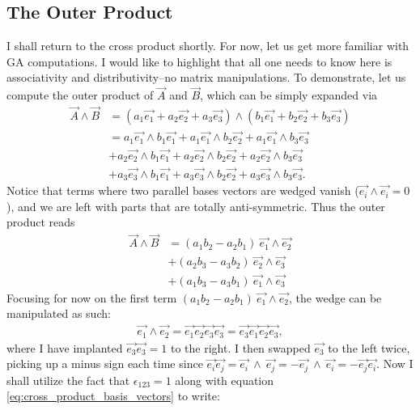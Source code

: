 \subsection{The Outer Product}
I shall return to the cross product shortly. For now, let us get more familiar with GA computations. I would like to highlight that all one needs to know here is associativity and distributivity--no matrix manipulations. To demonstrate, let us compute the outer product of $\vec{A} $ and $\vec{B} $, which can be simply expanded via
\begin{align*}
    \vec{A} \wedge \vec{B}  &= (a_1 \vec{e_1} + a_2 \vec{e_2} + a_3 \vec{e_3}) \wedge (b_1 \vec{e_1} + b_2 \vec{e_2} + b_3 \vec{e_3}) \\
                &= a_1 \vec{e_1} \wedge b_1 \vec{e_1} + a_1 \vec{e_1} \wedge b_2 \vec{e_2} + a_1 \vec{e_1} \wedge b_3 \vec{e_3} \\
                &+ a_2 \vec{e_2} \wedge b_1 \vec{e_1} + a_2 \vec{e_2} \wedge b_2 \vec{e_2} + a_2 \vec{e_2} \wedge b_3 \vec{e_3} \\
                &+ a_3 \vec{e_3} \wedge b_1 \vec{e_1} + a_3 \vec{e_3} \wedge b_2 \vec{e_2} + a_3 \vec{e_3} \wedge b_3 \vec{e_3}.
\end{align*}
Notice that terms where two parallel bases vectors are wedged vanish ($\vec{e_i} \wedge \vec{e_i} = 0$), and we are left with parts that are totally anti-symmetric. Thus the outer product reads
\begin{align*}
    \vec{A}  \wedge \vec{B}   &= (a_1 b_2 - a_2 b_1) \ \vec{e_1} \wedge \vec{e_2} \\
                &+ (a_2 b_3 - a_3 b_2) \ \vec{e_2} \wedge \vec{e_3} \\
                &+ (a_1 b_3 - a_3 b_1 ) \ \vec{e_1} \wedge \vec{e_3} 
\end{align*}
Focusing for now on the first term $ (a_1 b_2 - a_2 b_1) \ \vec{e_1} \wedge \vec{e_2}$, the wedge can be manipulated as such:
\begin{align*}
    \vec{e_1} \wedge \vec{e_2} = \vec{e_1} \vec{e_2} \vec{e_3} \vec{e_3} =  \vec{e_3} \vec{e_1} \vec{e_2} \vec{e_3},
\end{align*}
where I have implanted $\vec{e_3} \vec{e_3} = 1$ to the right. I then swapped $\vec{e_3}$ to the left twice, picking up a minus sign each time since $\vec{e_i} \vec{e_j} = \vec{e_i} \ \wedge \ \vec{e_j} = - \vec{e_j} \ \wedge \ \vec{e_i} = - \vec{e_j} \vec{e_i}$. Now I shall utilize the fact that $\epsilon_{123} = 1$ along with equation \eqref{eq:cross_product_basis_vectors} to write:
